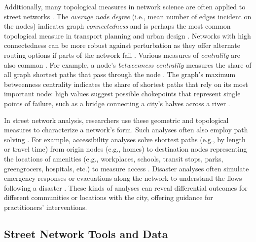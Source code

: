 \documentclass[12pt,letterpaper]{article} %
\begin{document}
Additionally, many topological measures in network science are often applied to street networks \citep{barthelemy_spatial_2011}. The \textit{average node degree} (i.e., mean number of edges incident on the nodes) indicates graph \textit{connectedness} and is perhaps the most common topological measure in transport planning and urban design \citep[e.g.,][]{barrington-leigh_century_2015,barrington-leigh_more_2017,barrington-leigh_global_2020}. Networks with high connectedness can be more robust against perturbation as they offer alternate routing options if parts of the network fail \citep{boeing_resilient_2024}. Various measures of \textit{centrality} are also common \citep{crucitti_centrality_2006}. For example, a node's \textit{betweenness centrality} measures the share of all graph shortest paths that pass through the node \citep{barthelemy_betweenness_2004,barthelemy_self-organization_2013}. The graph's maximum betweenness centrality indicates the share of shortest paths that rely on its most important node: high values suggest possible chokepoints that represent single points of failure, such as a bridge connecting a city's halves across a river \citep{boeing_resilient_2024}.

In street network analysis, researchers use these geometric and topological measures to characterize a network's form. Such analyses often also employ path solving \citep{miller_measuring_1999,wang_road_2020}. For example, accessibility analyses solve shortest paths (e.g., by length or travel time) from origin nodes (e.g., homes) to destination nodes representing the locations of amenities (e.g., workplaces, schools, transit stops, parks, greengrocers, hospitals, etc.) to measure access \citep{foti_behavioral_2014,liu_generalized_2022}. Disaster analyses often simulate emergency responses or evacuations along the network to understand the flows following a disaster \citep{sasabe_road_2020,tamakloe_finding_2021}. These kinds of analyses can reveal differential outcomes for different communities or locations with the city, offering guidance for practitioners' interventions.

\subsection{Street Network Tools and Data}
\end{document}
